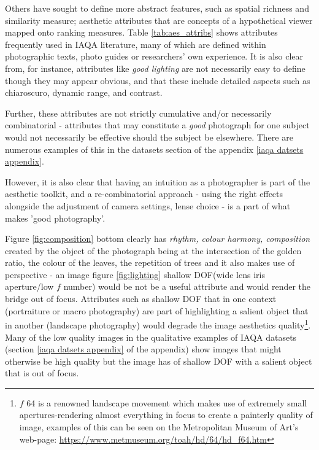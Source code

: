 Others have sought to define more abstract features, such as spatial richness\cite{Lo2013} and similarity measure\cite{Datta2006}; aesthetic attributes that are concepts of a hypothetical viewer mapped onto ranking measures. Table \ref{tab:aes_attribs} shows attributes frequently used in IAQA literature, many of which are defined within photographic texts, photo guides or researchers' own experience. It is also clear from, for instance, attributes like \textit{good lighting} are not necessarily easy to define though they may appear obvious, and that these include detailed aspects such as chiaroscuro, dynamic range, and contrast. 

\par Further, these attributes are not strictly cumulative and/or necessarily combinatorial - attributes that may constitute a \textit{good} photograph for one subject would not necessarily be effective should the subject be elsewhere. There are numerous examples of this in the datasets section of the appendix  \ref{iaqa datsets appendix}. 

\par However, it is also clear that having an intuition as a photographer is part of the aesthetic toolkit, and a re-combinatorial approach - using the right effects alongside the adjustment of camera settings, lense choice - is a part of what makes 'good photography'.

\par Figure \ref{fig:composition} bottom clearly has \textit{rhythm, colour harmony, composition} created by the object of the photograph being at the intersection of the golden ratio, the colour of the leaves, the repetition of trees and it also makes use of perspective - an image figure \ref{fig:lighting} shallow DOF(wide lens iris aperture/low $f$ number)  would be not be a useful attribute and would render the bridge out of focus. Attributes such as shallow DOF that in one context (portraiture or macro photography) are part of highlighting a salient object that in another (landscape photography) would degrade the image aesthetics quality\footnote{$f$ 64 is a renowned landscape movement which makes use of extremely small apertures-rendering almost everything in focus to create a painterly quality of image, examples of this can be seen on the Metropolitan Museum of Art's web-page:  \href{https://www.metmuseum.org/toah/hd/f64/hd_f64.htm}{https://www.metmuseum.org/toah/hd/\f64/hd\_f64.htm}}. Many of the low quality images in the qualitative examples of IAQA datasets (section \ref{iaqa datsets appendix} of the appendix) show images that might otherwise be high quality but the image has of shallow DOF with a salient object that is out of focus.

